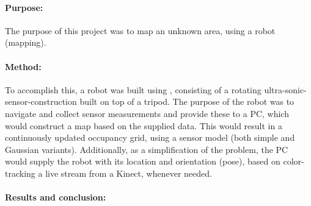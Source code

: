 \paragraph{Purpose:}The purpose of this project was to map an unknown area, using a robot (mapping).

\paragraph{Method:}To accomplish this, a robot was built using \legoms, consisting of a rotating ultra-sonic-sensor-construction built on top of a tripod.
The purpose of the robot was to navigate and collect sensor measurements and provide these to a PC, which would construct a map based on the supplied data.
This would result in a continuously updated occupancy grid, using a sensor model (both simple and Gaussian variants).
Additionally, as a simplification of the problem, the PC would supply the robot with its location and orientation (pose), based on color-tracking a live stream from a Kinect, whenever needed.

\paragraph{Results and conclusion:}
